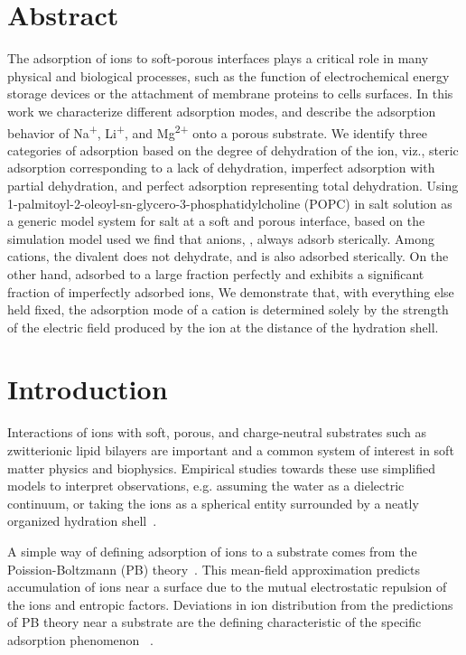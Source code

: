     \section{Abstract}
    The adsorption of ions to soft-porous interfaces plays a critical role in 
    many physical and biological processes, such as the function of electrochemical 
    energy storage devices or 
    the attachment of membrane proteins to cells surfaces. 
    In this work we characterize different adsorption modes, and
    describe the adsorption behavior of Na\textsuperscript{+}, Li\textsuperscript{+}, and Mg\textsuperscript{2+} 
    {onto a porous substrate}.
    We identify three categories of adsorption based on 
    the degree of dehydration of the ion, 
    viz., steric adsorption {corresponding to a lack of dehydration}, 
    imperfect adsorption {with partial dehydration}, and 
    perfect adsorption {representing total dehydration}.
    Using 1-palmitoyl-2-oleoyl-sn-glycero-3-phosphatidylcholine (POPC) 
    in salt solution as a generic model system for salt at a soft and 
    porous interface, based on the simulation model used we find that 
    anions, \cl, always adsorb sterically. Among cations, the divalent
    \mg does not dehydrate, and is {also} adsorbed sterically. 
    On the other hand, \na  
    adsorbed to a large fraction perfectly 
    {and \li exhibits a significant fraction of imperfectly adsorbed ions,}
    We demonstrate that, with everything else held fixed, the 
    adsorption mode of a cation is determined
    solely by the strength of the electric field produced by the 
    ion at the distance of the hydration shell. 

\section{Introduction}
Interactions of ions with soft, porous, and charge-neutral substrates
such as zwitterionic lipid bilayers are important and a common
system of interest in soft matter physics and biophysics.
Empirical studies towards these use simplified
models to interpret observations, e.g. assuming the water as a
dielectric continuum,
or taking the ions as a spherical entity surrounded
by a neatly organized hydration shell~\cite{israelachvili:2011:intermol}.

A simple way of defining adsorption of ions to a substrate 
comes from the Poission-Boltzmann (PB) theory~\cite{israelachvili:2011:intermol}.
{This mean-field approximation predicts accumulation
of ions near a surface due to the mutual electrostatic repulsion
of the ions and entropic factors.}
{Deviations in ion distribution from the predictions of PB theory near a substrate are
    the defining characteristic of the specific adsorption phenomenon
~\cite{stern:1924:theory,grahame:1947:electrical}.}

